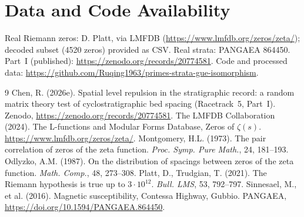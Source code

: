 \documentclass[12pt,a4paper]{article}
\begin{document}
\section*{Data and Code Availability}
Real Riemann zeros: D. Platt, via LMFDB (\url{https://www.lmfdb.org/zeros/zeta/}); decoded subset (4520 zeros) provided as CSV. Real strata: PANGAEA 864450. Part~I (published): \url{https://zenodo.org/records/20774581}. Code and processed data: \url{https://github.com/Ruqing1963/primes-strata-gue-isomorphism}.

\begin{thebibliography}{9}
 Chen, R. (2026e). Spatial level repulsion in the stratigraphic record: a random matrix theory test of cyclostratigraphic bed spacing (Racetrack~5, Part~I). Zenodo, \url{https://zenodo.org/records/20774581}.
 The LMFDB Collaboration (2024). The L-functions and Modular Forms Database, Zeros of $\zeta(s)$. \url{https://www.lmfdb.org/zeros/zeta/}.
 Montgomery, H.L. (1973). The pair correlation of zeros of the zeta function. \textit{Proc. Symp. Pure Math.}, 24, 181--193.
 Odlyzko, A.M. (1987). On the distribution of spacings between zeros of the zeta function. \textit{Math. Comp.}, 48, 273--308.
 Platt, D., Trudgian, T. (2021). The Riemann hypothesis is true up to $3\cdot10^{12}$. \textit{Bull. LMS}, 53, 792--797.
 Sinnesael, M., et al. (2016). Magnetic susceptibility, Contessa Highway, Gubbio. PANGAEA, \url{https://doi.org/10.1594/PANGAEA.864450}.
\end{thebibliography}
\end{document}
